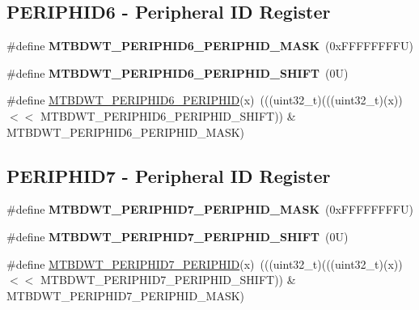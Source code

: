 \subsection*{P\+E\+R\+I\+P\+H\+I\+D6 -\/ Peripheral ID Register}
\begin{DoxyCompactItemize}
\item 
\mbox{\label{group___m_t_b___register___masks_gadc45ad91346a567902451afe445949a0}} 
\#define {\bfseries M\+T\+B\+D\+W\+T\+\_\+\+P\+E\+R\+I\+P\+H\+I\+D6\+\_\+\+P\+E\+R\+I\+P\+H\+I\+D\+\_\+\+M\+A\+SK}~(0x\+F\+F\+F\+F\+F\+F\+F\+F\+U)
\item 
\mbox{\label{group___m_t_b___register___masks_gaefb0c9e8c3e0ae087571adc2a087a670}} 
\#define {\bfseries M\+T\+B\+D\+W\+T\+\_\+\+P\+E\+R\+I\+P\+H\+I\+D6\+\_\+\+P\+E\+R\+I\+P\+H\+I\+D\+\_\+\+S\+H\+I\+FT}~(0\+U)
\item 
\#define \mbox{\hyperlink{group___m_t_b___register___masks_ga74cfcb5a32e50f288fee821949807eda}{M\+T\+B\+D\+W\+T\+\_\+\+P\+E\+R\+I\+P\+H\+I\+D6\+\_\+\+P\+E\+R\+I\+P\+H\+ID}}(x)~(((uint32\+\_\+t)(((uint32\+\_\+t)(x)) $<$$<$ M\+T\+B\+D\+W\+T\+\_\+\+P\+E\+R\+I\+P\+H\+I\+D6\+\_\+\+P\+E\+R\+I\+P\+H\+I\+D\+\_\+\+S\+H\+I\+FT)) \& M\+T\+B\+D\+W\+T\+\_\+\+P\+E\+R\+I\+P\+H\+I\+D6\+\_\+\+P\+E\+R\+I\+P\+H\+I\+D\+\_\+\+M\+A\+SK)
\end{DoxyCompactItemize}
\subsection*{P\+E\+R\+I\+P\+H\+I\+D7 -\/ Peripheral ID Register}
\begin{DoxyCompactItemize}
\item 
\mbox{\label{group___m_t_b___register___masks_gab91f1c8e7109af4dd71c9fab84ece4e4}} 
\#define {\bfseries M\+T\+B\+D\+W\+T\+\_\+\+P\+E\+R\+I\+P\+H\+I\+D7\+\_\+\+P\+E\+R\+I\+P\+H\+I\+D\+\_\+\+M\+A\+SK}~(0x\+F\+F\+F\+F\+F\+F\+F\+F\+U)
\item 
\mbox{\label{group___m_t_b___register___masks_gaa836402ed643b25f730532cae8072b7d}} 
\#define {\bfseries M\+T\+B\+D\+W\+T\+\_\+\+P\+E\+R\+I\+P\+H\+I\+D7\+\_\+\+P\+E\+R\+I\+P\+H\+I\+D\+\_\+\+S\+H\+I\+FT}~(0\+U)
\item 
\#define \mbox{\hyperlink{group___m_t_b___register___masks_gad29073f33066706ed4cf4264a244caf5}{M\+T\+B\+D\+W\+T\+\_\+\+P\+E\+R\+I\+P\+H\+I\+D7\+\_\+\+P\+E\+R\+I\+P\+H\+ID}}(x)~(((uint32\+\_\+t)(((uint32\+\_\+t)(x)) $<$$<$ M\+T\+B\+D\+W\+T\+\_\+\+P\+E\+R\+I\+P\+H\+I\+D7\+\_\+\+P\+E\+R\+I\+P\+H\+I\+D\+\_\+\+S\+H\+I\+FT)) \& M\+T\+B\+D\+W\+T\+\_\+\+P\+E\+R\+I\+P\+H\+I\+D7\+\_\+\+P\+E\+R\+I\+P\+H\+I\+D\+\_\+\+M\+A\+SK)
\end{DoxyCompactItemize}
